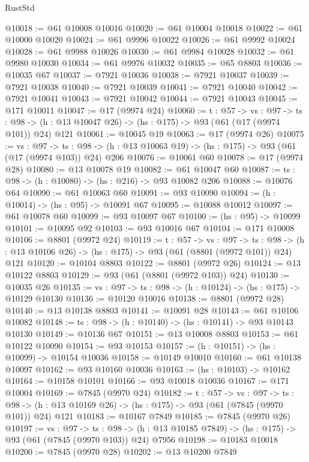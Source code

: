 \begin{lexlean}{RustStd}
\begin{coremodule}
@10018 := @61 @10008 @10016
@10020 := @61 @10004 @10018
@10022 := @61 @10000 @10020
@10024 := @61 @9996 @10022
@10026 := @61 @9992 @10024
@10028 := @61 @9988 @10026
@10030 := @61 @9984 @10028
@10032 := @61 @9980 @10030
@10034 := @61 @9976 @10032
@10035 := @65 @8803
@10036 := @10035 @67
@10037 := @7921 @10036
@10038 := @7921 @10037
@10039 := @7921 @10038
@10040 := @7921 @10039
@10041 := @7921 @10040
@10042 := @7921 @10041
@10043 := @7921 @10042
@10044 := @7921 @10043
@10045 := @171 @10011
@10047 := @17 (@9974 @24)
@10060 := {t : @57} ->
  {vs : @97} ->
  {ts : @98} -> (h : @13 @10047 @26) -> (hs : @175) -> @93 (@61 (@17 (@9974 @101)) @24) @121
@10061 := @10045 @19
@10063 := @17 (@9974 @26)
@10075 := {vs : @97} ->
  {ts : @98} -> (h : @13 @10063 @19) -> (hs : @175) -> @93 (@61 (@17 (@9974 @103)) @24) @206
@10076 := @10061 @60
@10078 := @17 (@9974 @28)
@10080 := @13 @10078 @19
@10082 := @61 @10047 @60
@10087 := {ts : @98} -> (h : @10080) -> (hs : @216) -> @93 @10082 @206
@10088 := @10076 @64
@10090 := @61 @10063 @60
@10091 := @93 @10090
@10094 := (h : @10014) -> (hs : @95) -> @10091 @67
@10095 := @10088 @10012
@10097 := @61 @10078 @60
@10099 := @93 @10097 @67
@10100 := (hs : @95) -> @10099
@10101 := @10095 @92
@10103 := @93 @10016 @67
@10104 := @171 @10008
@10106 := @8801 (@9972 @24)
@10119 := {t : @57} ->
  {vs : @97} ->
  {ts : @98} -> (h : @13 @10106 @26) -> (hs : @175) -> @93 (@61 (@8801 (@9972 @101)) @24) @121
@10120 := @10104 @8803
@10122 := @8801 (@9972 @26)
@10124 := @13 @10122 @8803
@10129 := @93 (@61 (@8801 (@9972 @103)) @24)
@10130 := @10035 @26
@10135 := {vs : @97} -> {ts : @98} -> (h : @10124) -> (hs : @175) -> @10129 @10130
@10136 := @10120 @10016
@10138 := @8801 (@9972 @28)
@10140 := @13 @10138 @8803
@10141 := @10091 @28
@10143 := @61 @10106 @10082
@10148 := {ts : @98} -> (h : @10140) -> (hs : @10141) -> @93 @10143 @10130
@10149 := @10136 @67
@10151 := @13 @10008 @8803
@10153 := @61 @10122 @10090
@10154 := @93 @10153
@10157 := (h : @10151) -> (hs : @10099) -> @10154 @10036
@10158 := @10149 @10010
@10160 := @61 @10138 @10097
@10162 := @93 @10160 @10036
@10163 := (hs : @10103) -> @10162
@10164 := @10158 @10101
@10166 := @93 @10018 @10036
@10167 := @171 @10004
@10169 := @7845 (@9970 @24)
@10182 := {t : @57} ->
  {vs : @97} ->
  {ts : @98} -> (h : @13 @10169 @26) -> (hs : @175) -> @93 (@61 (@7845 (@9970 @101)) @24) @121
@10183 := @10167 @7849
@10185 := @7845 (@9970 @26)
@10197 := {vs : @97} ->
  {ts : @98} -> (h : @13 @10185 @7849) -> (hs : @175) -> @93 (@61 (@7845 (@9970 @103)) @24) @7956
@10198 := @10183 @10018
@10200 := @7845 (@9970 @28)
@10202 := @13 @10200 @7849

\end{coremodule}
\end{lexlean}
